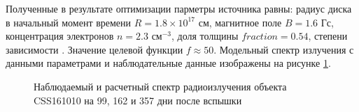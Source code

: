 Полученные в результате оптимизации парметры источника равны: радиус диска в начальный момент времени $R = 1.8\times10^17 \text{ см}$, магнитное поле $B = 1.6 \text{ Гс}$, концентрация электронов $n = 2.3 \text{ см}^{-3}$, доля толщины $fraction = 0.54 $, степени зависимости . Значение целевой функции $f \approx 50$. Модельный спектр излучения  с данными параметрами и наблюдательные данные изображены на рисунке \ref{synchrotronSeries}.

\begin{figure}
	\centering
	\caption{Наблюдаемый и расчетный спектр радиоизлучения объекта CSS161010 на 99, 162 и 357 дни после вспышки}
	\label{synchrotronSeries}
\end{figure}